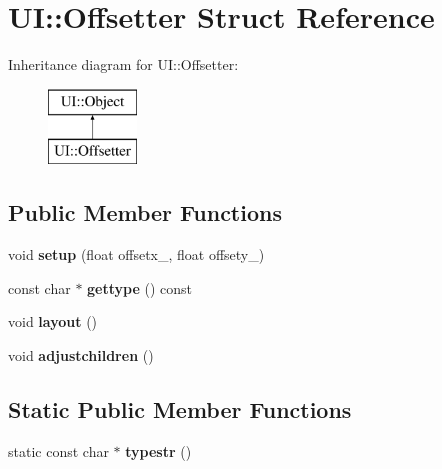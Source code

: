 \hypertarget{struct_u_i_1_1_offsetter}{}\section{UI\+:\+:Offsetter Struct Reference}
\label{struct_u_i_1_1_offsetter}
Inheritance diagram for UI\+:\+:Offsetter\+:\begin{figure}[H]
\begin{center}
\leavevmode
\includegraphics[height=2.000000cm]{struct_u_i_1_1_offsetter}
\end{center}
\end{figure}
\subsection*{Public Member Functions}
\begin{DoxyCompactItemize}
\item 
\mbox{\label{struct_u_i_1_1_offsetter_a96c873862c7fb417cb923ef17b8a45a6}} 
void {\bfseries setup} (float offsetx\+\_\+, float offsety\+\_\+)
\item 
\mbox{\label{struct_u_i_1_1_offsetter_ac06efa3a952e053612007ba8536dce61}} 
const char $\ast$ {\bfseries gettype} () const
\item 
\mbox{\label{struct_u_i_1_1_offsetter_a6497b1d6e21af612c36ad42fc9168e7c}} 
void {\bfseries layout} ()
\item 
\mbox{\label{struct_u_i_1_1_offsetter_a25a68608cb573e1640743de3e70f10e9}} 
void {\bfseries adjustchildren} ()
\end{DoxyCompactItemize}
\subsection*{Static Public Member Functions}
\begin{DoxyCompactItemize}
\item 
\mbox{\label{struct_u_i_1_1_offsetter_a2490693981b35a04ac3d32c40bf6e43b}} 
static const char $\ast$ {\bfseries typestr} ()
\end{DoxyCompactItemize}
